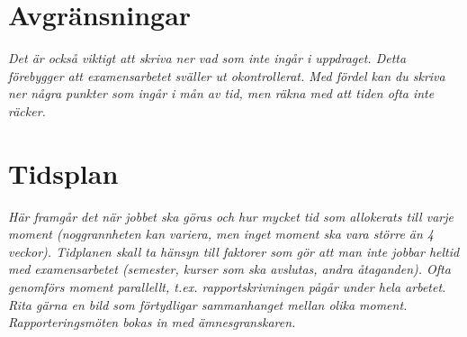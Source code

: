 \documentclass[11pt]{article}
\begin{document}
\section{Avgränsningar}

\textit{Det är också viktigt att skriva ner vad som inte ingår i uppdraget. Detta förebygger att examensarbetet sväller ut okontrollerat. Med fördel kan du skriva ner några punkter som ingår i mån av tid, men räkna med att tiden ofta inte räcker.}

\section{Tidsplan}

\textit{Här framgår det när jobbet ska göras och hur mycket tid som allokerats till varje moment (noggrannheten kan variera, men inget moment ska vara större än 4 veckor). Tidplanen skall ta hänsyn till faktorer som gör att man inte jobbar heltid med examensarbetet (semester, kurser som ska avslutas, andra åtaganden). Ofta genomförs moment parallellt, t.ex. rapportskrivningen pågår under hela arbetet. Rita gärna en bild som förtydligar sammanhanget mellan olika moment. Rapporteringsmöten bokas in med ämnesgranskaren.}
\end{document}
